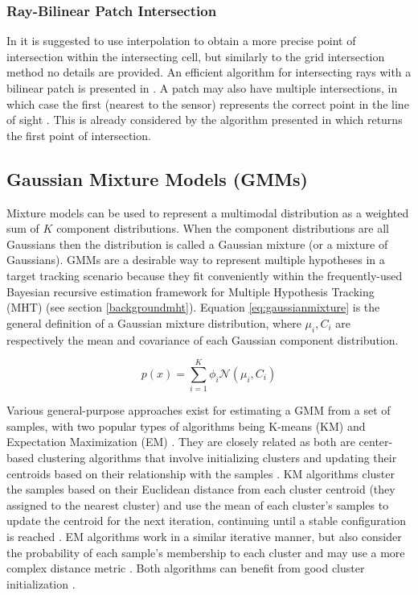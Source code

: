 \documentclass[journal]{IEEEtran}
\begin{document}
\subsubsection{Ray-Bilinear Patch Intersection} \label{bilinearpatchintersection}
In \cite{collins1998using} it is suggested to use interpolation to obtain a more precise point of intersection within the intersecting cell, but similarly to the grid intersection method no details are provided. An efficient algorithm for intersecting rays with a bilinear patch is presented in \cite{ramsey2004ray}. A patch may also have multiple intersections, in which case the first (nearest to the sensor) represents the correct point in the line of sight \cite{ramsey2004ray}. This is already considered by the algorithm presented in \cite{ramsey2004ray} which returns the first point of intersection.

\subsection{Gaussian Mixture Models (GMMs)} \label{backgroundgmm}
Mixture models can be used to represent a multimodal distribution as a weighted sum of $K$ component distributions. When the component distributions are all Gaussians then the distribution is called a Gaussian mixture (or a mixture of Gaussians). GMMs are a desirable way to represent multiple hypotheses in a target tracking scenario because they fit conveniently within the frequently-used Bayesian recursive estimation framework for Multiple Hypothesis Tracking (MHT) (see section \ref{backgroundmht}). Equation \ref{eq:gaussianmixture} is the general definition of a Gaussian mixture distribution, where $\mu_i,C_i$ are respectively the mean and covariance of each Gaussian component distribution.

\begin{dmath} \label{eq:gaussianmixture}
    { p(x) = \sum_{i = 1}^K \phi_i \mathcal{N}(\mu_i, C_i) }
\end{dmath}

Various general-purpose approaches exist for estimating a GMM from a set of samples, with two popular types of algorithms being K-means (KM) and Expectation Maximization (EM) \cite{reddy2008trust, umale2014overview, hamerly2004learning}. They are closely related as both are center-based clustering algorithms that involve initializing clusters and updating their centroids based on their relationship with the samples \cite{hamerly2004learning}. KM algorithms cluster the samples based on their Euclidean distance from each cluster centroid (they assigned to the nearest cluster) and use the mean of each cluster's samples to update the centroid for the next iteration, continuing until a stable configuration is reached \cite{umale2014overview}. EM algorithms work in a similar iterative manner, but also consider the probability of each sample's membership to each cluster and may use a more complex distance metric \cite{umale2014overview}. Both algorithms can benefit from good cluster initialization \cite{hamerly2004learning}.
\end{document}
